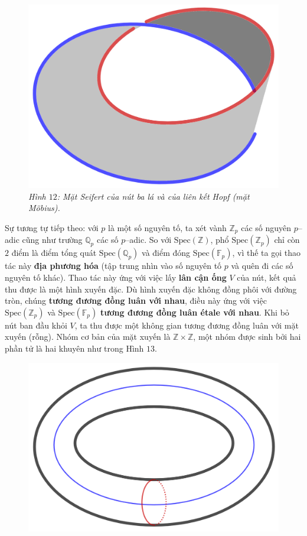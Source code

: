 \begin{multicols}{2}
\begin{figure}[H]
		\includegraphics[width= 0.4\linewidth]{seifert2}
		\caption{\small\textit{\color{duongvaotoanhoc}Hình $12$: Mặt Seifert của nút ba lá và của liên kết Hopf (mặt M\"obius).}}
		\vspace*{-10pt}
	\end{figure}
	Sự tương tự tiếp theo: với $p$ là một số nguyên tố, ta xét vành $\mathbb{Z}_p$ các số nguyên $p$--adic cũng như trường $\mathbb{Q}_p$ các số $p$--adic. So với $\text{Spec}(\mathbb{Z})$, phổ $\text{Spec}(\mathbb{Z}_p)$ chỉ còn $2$ điểm là điểm tổng quát $\text{Spec}(\mathbb{Q}_p)$ và điểm đóng $\text{Spec}(\mathbb{F}_p)$, vì thế ta gọi thao tác này {\bf\color{duongvaotoanhoc} địa phương hóa} (tập trung nhìn vào số nguyên tố $p$ và quên đi các số nguyên tố khác). Thao tác này ứng với việc lấy {\bf\color{duongvaotoanhoc} lân cận ống} $V$ của nút, kết quả thu được là một hình xuyến đặc. Dù hình xuyến đặc không đồng phôi với đường tròn, chúng {\bf\color{duongvaotoanhoc} tương đương đồng luân với nhau}, điều này ứng với việc $\text{Spec}(\mathbb{Z}_p)$ và $\text{Spec}(\mathbb{F}_p)$ {\bf\color{duongvaotoanhoc} tương đương đồng luân étale với nhau}. Khi bỏ nút ban đầu khỏi $V$, ta thu được một không gian tương đương đồng luân với mặt xuyến (rỗng). Nhóm cơ bản của mặt xuyến là $\mathbb{Z} \times \mathbb{Z}$, một nhóm được sinh bởi hai phần tử là hai khuyên như trong Hình $13$.
	\begin{figure}[H]
		\vspace*{-5pt}
		\centering
		\captionsetup{labelformat= empty, justification=centering}
		\includegraphics[width= 0.65\linewidth]{h13}

\end{figure}
\end{multicols}
